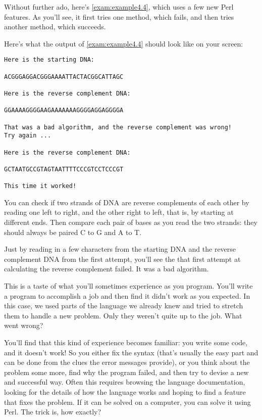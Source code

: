 Without further ado, here's \autoref{exam:example4.4}, which uses a few new Perl features. As you'll see, it first tries one method, which fails, and then tries another method, which succeeds. 



Here's what the output of \autoref{exam:example4.4} should look like on your screen:

\begin{lstlisting}
Here is the starting DNA:

ACGGGAGGACGGGAAAATTACTACGGCATTAGC

Here is the reverse complement DNA:

GGAAAAGGGGAAGAAAAAAAGGGGAGGAGGGGA

That was a bad algorithm, and the reverse complement was wrong!
Try again ...

Here is the reverse complement DNA:

GCTAATGCCGTAGTAATTTTCCCGTCCTCCCGT

This time it worked!
\end{lstlisting}

You can check if two strands of DNA are reverse complements of each other by reading one left to right, and the other right to left, that is, by starting at different ends. Then compare each pair of bases as you read the two strands: they should always be paired C to G and A to T.

Just by reading in a few characters from the starting DNA and the reverse complement DNA from the first attempt, you'll see the that first attempt at calculating the reverse complement failed. It was a bad algorithm.

This is a taste of what you'll sometimes experience as you program. You'll write a program to accomplish a job and then find it didn't work as you expected. In this case, we used parts of the language we already knew and tried to stretch them to handle a new problem. Only they weren't quite up to the job. What went wrong?

You'll find that this kind of experience becomes familiar: you write some code, and it doesn't work! So you either fix the syntax (that's usually the easy part and can be done from the clues the error messages provide), or you think about the problem some more, find why the program failed, and then try to devise a new and successful way. Often this requires browsing the language documentation, looking for the details of how the language works and hoping to find a feature that fixes the problem. If it can be solved on a computer, you can solve it using Perl. The trick is, how exactly? 

